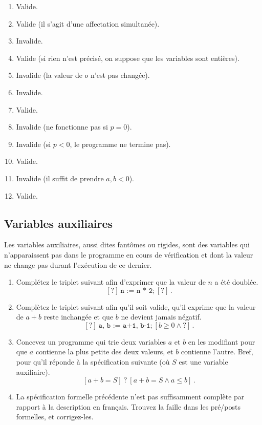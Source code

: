 \begin{solution}
\begin{enumerate}[label={\textbf{\alph*.}}]
	\item Valide.
	\item Valide (il s'agit d'une affectation simultanée).
	\item Invalide.
	\item Valide (si rien n'est précisé,
	on suppose que les variables sont entières).
	\item Invalide (la valeur de $o$ n'est pas changée).
	\item Invalide.
	\item Valide.
	\item Invalide (ne fonctionne pas si $p = 0$).
	\item Invalide (si $p < 0$, le programme ne termine pas).
	\item Valide.
	\item Invalide (il suffit de prendre $a, b < 0$).
	\item Valide.
\end{enumerate}
\end{solution}

\subsection{Variables auxiliaires}
Les variables auxiliaires, aussi dites fantômes ou rigides,
sont des variables qui n'apparaissent pas dans le programme
en cours de vérification et dont la valeur ne change pas
durant l'exécution de ce dernier.

\begin{enumerate}[label={\textbf{\alph*.}}]
	\item Complétez le triplet suivant afin d'exprimer
	que la valeur de $n$ a été doublée.
	\[
	[?]\ \texttt{n := n * 2;}\ [?]\,.
	\]
	\item Complètez le triplet suivant afin qu'il soit valide,
	qu'il exprime que la valeur de $a + b$ reste inchangée
	et que $b$ ne devient jamais négatif.
	\[
	[?]\ \texttt{a, b := a+1, b-1;}\ [b \ge 0 \land{} ?]\,.
	\]
	\item Concevez un programme qui \og trie \fg{} deux variables $a$ et $b$
	en les modifiant pour que $a$ contienne la plus petite des deux valeurs,
	et $b$ contienne l'autre.
	Bref, pour qu'il réponde à la spécification suivante
	(où $S$ est une variable auxiliaire).
	\[
	[a + b = S]\ \texttt{?}\ [a + b = S \land a \le b]\,.
	\]
	\item La spécification formelle précédente
	n'est pas suffisamment complète par rapport
	à la description en français.
	Trouvez la faille dans les pré/posts formelles, et corrigez-les.
\end{enumerate}

